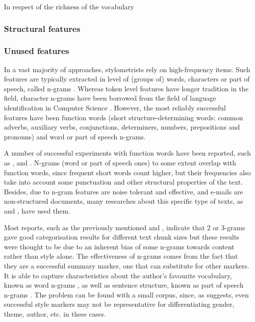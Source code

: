 In respect of the richness of the vocabulary

\subsubsection{Structural features}\label{sssect:strucf}

\subsubsection{Unused features}\label{sssect:unusedf}

In a vast majority of approaches, stylometrists rely on high-frequency items. Such features are typically extracted in level of (groups of) words, characters or part of speech, called n-grams \citep{kjell1994discrimination}. Whereas token level features have longer tradition in the field, character n-grams have been borrowed from the field of language identification in Computer Science \citep{stamatatos2009survey, eder2011style}. However, the most reliably successful features have been function words (short structure-determining words: common adverbs, auxiliary verbs, conjunctions, determiners, numbers, prepositions and pronouns) and word or part of speech n-grams. 

A number of successful experiments with function words have been reported, such as \cite{craig1999authorial}, \cite{koppel2006feature} and \cite{de2001mining}. N-grams (word or part of speech ones) to some extent overlap with function words, since frequent short words count higher, but their frequencies also take into account some punctuation and other structural properties of the text. Besides, due to n-gram features are noise tolerant and effective, and e-mails are non-structured documents, many researches about this specific type of texts, as \cite{brocardo2013authorship} and \cite{corney2001identifying}, have used them.

Most reports, such as the previously mentioned \cite{kjell1994discrimination} and \cite{corney2001identifying}, indicate that 2 or 3-grams gave good categorisation results for different text chunk sizes but these results were thought to be due to an inherent bias of some n-grams towards content rather than style alone. The effectiveness of n-grams comes from the fact that they are a successful summary marker, one that can substitute for other markers. It is able to capture characteristics about the author's favourite vocabulary, known as word n-grams \citep{diederich2003authorship}, as well as sentence structure, known as part of speech n-grams \citep{baayen1996outside, argamon1998routing}. The problem can be found with a small corpus, since, as \cite{baayen2000back} suggests, even successful style markers may not be representative for differentiating gender, theme, author, etc. in these cases.

